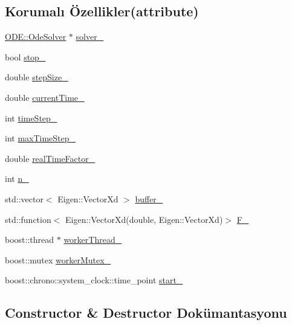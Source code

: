 \subsection*{Korumalı Özellikler(attribute)}
\begin{DoxyCompactItemize}
\item 
\mbox{\hyperlink{classODE_1_1OdeSolver}{O\+D\+E\+::\+Ode\+Solver}} $\ast$ \mbox{\hyperlink{classODE_1_1Simulator_adf4b57794ade46b948d694fd74137cdd}{solver\+\_\+}}
\item 
bool \mbox{\hyperlink{classODE_1_1Simulator_a501af5b1568e2050d0ad0e0549a6e9ae}{stop\+\_\+}}
\item 
double \mbox{\hyperlink{classODE_1_1Simulator_a18824234957807ef10ec4e06593d8994}{step\+Size\+\_\+}}
\item 
double \mbox{\hyperlink{classODE_1_1Simulator_a63dba896102ad7068b3b73c36c8a3396}{current\+Time\+\_\+}}
\item 
int \mbox{\hyperlink{classODE_1_1Simulator_acb633e5041df7123e1c9280aabdd62f8}{time\+Step\+\_\+}}
\item 
int \mbox{\hyperlink{classODE_1_1Simulator_af876453580eea04b4a03fe479db979d7}{max\+Time\+Step\+\_\+}}
\item 
double \mbox{\hyperlink{classODE_1_1Simulator_ac7a1ef92a72e2f16acc49ae59c03d289}{real\+Time\+Factor\+\_\+}}
\item 
int \mbox{\hyperlink{classODE_1_1Simulator_a12321b354ba89d29225ce9d6380ae5bf}{n\+\_\+}}
\item 
std\+::vector$<$ Eigen\+::\+Vector\+Xd $>$ \mbox{\hyperlink{classODE_1_1Simulator_a5be06804c54afe1708b4317777bc39e3}{buffer\+\_\+}}
\item 
std\+::function$<$ Eigen\+::\+Vector\+Xd(double, Eigen\+::\+Vector\+Xd)$>$ \mbox{\hyperlink{classODE_1_1Simulator_a0c71f6d08323e3f4834b142ca60e6191}{F\+\_\+}}
\item 
boost\+::thread $\ast$ \mbox{\hyperlink{classODE_1_1Simulator_a3ad6a7dda3c7486ac492c7845fbf7a13}{worker\+Thread\+\_\+}}
\item 
boost\+::mutex \mbox{\hyperlink{classODE_1_1Simulator_afc94484b88bf373dd2d78055f7fa4ee6}{worker\+Mutex\+\_\+}}
\item 
boost\+::chrono\+::system\+\_\+clock\+::time\+\_\+point \mbox{\hyperlink{classODE_1_1Simulator_a843661584ef68260d23eed61ad00bdb0}{start\+\_\+}}
\end{DoxyCompactItemize}


\subsection{Constructor \& Destructor Dokümantasyonu}
\mbox{\label{classODE_1_1Simulator_a5cb39d33919e0f4abf174c161b807ac0}} 
